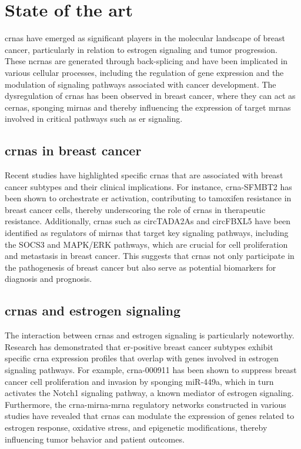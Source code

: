 \section{State of the art}
\Glspl{crna} have emerged as significant players in the
molecular landscape of breast cancer, particularly in relation to estrogen
signaling and tumor progression.
These \glspl{ncrna} are generated through back-splicing and have been
implicated in various cellular processes, including the regulation of gene
expression and the modulation of signaling pathways associated with cancer
development\supercite{li_circrna-sfmbt2_2023,tran_new_2020}.
The dysregulation of \glspl{crna} has been observed in breast cancer, where
they can act as \glspl{cerna}, sponging \glspl{mirna} and thereby influencing
the expression of target \glspl{mrna} involved in critical pathways such as
\gls{er} signaling\supercite{nair_circular_2016,xu_circrna_2022}.

\subsection{\Glspl{crna} in breast cancer}
Recent studies have highlighted specific \glspl{crna} that are associated with
breast cancer subtypes and their clinical implications.
For instance, \gls{crna}-SFMBT2 has been shown to orchestrate \gls{er}\textalpha{}
activation, contributing to tamoxifen resistance in breast cancer cells,
thereby underscoring the role of \glspl{crna} in therapeutic
resistance\supercite{li_circrna-sfmbt2_2023}.
Additionally, \glspl{crna} such as circTADA2As and circFBXL5 have been
identified as regulators of \glspl{mirna} that target key signaling pathways,
including the SOCS3 and MAPK/ERK pathways, which are crucial for cell
proliferation and metastasis in breast
cancer\supercite{xu_circtada2as_2019,gao_hsa_circrna_0006528_2019}.
This suggests that \glspl{crna} not only participate in the pathogenesis of
breast cancer but also serve as potential biomarkers for diagnosis and
prognosis\supercite{liu_influence_2021,chen_circepsti1_2018}.

\subsection{\Glspl{crna} and estrogen signaling}
The interaction between \glspl{crna} and estrogen signaling is particularly
noteworthy.
Research has demonstrated that \gls{er}-positive breast cancer subtypes exhibit
specific \gls{crna} expression profiles that overlap with genes involved in
estrogen signaling pathways\supercite{nair_circular_2016}.
For example, \gls{crna}-000911 has been shown to suppress breast cancer cell
proliferation and invasion by sponging miR-449a, which in turn activates the
Notch1 signaling pathway, a known mediator of estrogen
signaling\supercite{wang_comprehensive_2018}.
Furthermore, the \gls{crna}-\gls{mirna}-\gls{mrna} regulatory networks
constructed in various studies have revealed that \glspl{crna} can modulate the
expression of genes related to estrogen response, oxidative stress, and
epigenetic modifications, thereby influencing tumor behavior and patient
outcomes\supercite{xu_circrna_2022,nair_circular_2016}.
